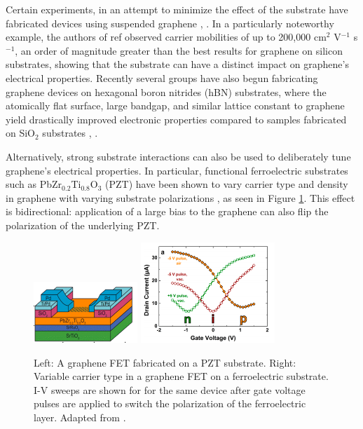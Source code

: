 \documentclass[edeposit,fullpage,draftthesis]{uiucthesis2009}
\begin{document}
        Certain experiments, in an attempt to minimize the effect of the substrate have fabricated devices using suspended graphene \cite{Bolotin2008}, \cite{Du2008}. In a particularly noteworthy example, the authors of ref \cite{Bolotin2008} observed carrier mobilities of up to 200,000 cm$^2$ V$^{-1}$ s$^{-1}$, an order of magnitude greater than the best results for graphene on silicon substrates, showing that the substrate can have a distinct impact on graphene's electrical properties. Recently several groups have also begun fabricating graphene devices on hexagonal boron nitrides (hBN) substrates, where the atomically flat surface, large bandgap, and similar lattice constant to graphene yield drastically improved electronic properties compared to samples fabricated on SiO$_2$ substrates \cite {Dean2010}, \cite{Xue2011}.
    
        Alternatively, strong substrate interactions can also be used to deliberately tune graphene's electrical properties. In particular, functional ferroelectric substrates such as PbZr$_{0.2}$Ti$_{0.8}$O$_3$ (PZT) have been shown to vary carrier type and density in graphene with varying substrate polarizations \cite{Baeumer2013}, as seen in Figure \ref{fig:GonPZT}. This effect is bidirectional: application of a large bias to the graphene can also flip the polarization of the underlying PZT.
    
            \begin{figure}
            \centering
            \includegraphics[width=0.35\textwidth]{images/background/ChristophDevice.png}
            \includegraphics[width=0.45\textwidth]{images/background/ChristophFig4.png}
            \caption[Graphene on ferroelectric substrates]{Left: A graphene FET fabricated on a PZT substrate. Right: Variable carrier type in a graphene FET on a ferroelectric substrate. I-V sweeps are shown for for the same device after gate voltage pulses are applied to switch the polarization of the ferroelectric layer. Adapted from \cite{Baeumer2013}.}
            \label{fig:GonPZT}
            \end{figure}
        
\end{document}

